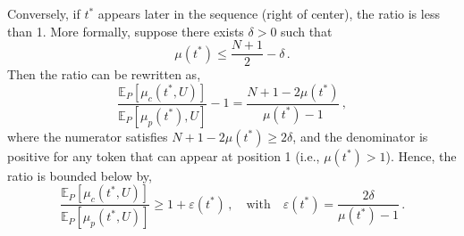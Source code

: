 \begin{remark}
\begin{itemize}
    Conversely, if \( t^* \) appears later in the sequence (right of center), the ratio is less than 1.
    More formally, suppose there exists \( \delta > 0 \) such that
    \begin{equation}
        \mu(t^*) \le \frac{N+1}{2} - \delta \,.
    \end{equation}
    Then the ratio can be rewritten as,
    \begin{equation}
        \frac{\mathbb{E}_P[\mu_c(t^*, U)]}{\mathbb{E}_P[\mu_p(t^*), U]} - 1
        = \frac{N + 1 - 2\mu(t^*)}{\mu(t^*) - 1} \,,
    \end{equation}
    where the numerator satisfies \( N + 1 - 2\mu(t^*) \ge 2\delta \), and the denominator is positive for any token that can appear at position 1 (i.e., \( \mu(t^*) > 1 \)).
    Hence, the ratio is bounded below by,
    \begin{equation}
        \frac{\mathbb{E}_P[\mu_c(t^*, U)]}{\mathbb{E}_P[\mu_p(t^*, U)]} \ge 1 + \varepsilon(t^*) \,, \quad
        \text{with} \quad \varepsilon(t^*) = \frac{2\delta}{\mu(t^*) - 1} \,.
    \end{equation}
%
\end{itemize}
%
\end{remark}
%